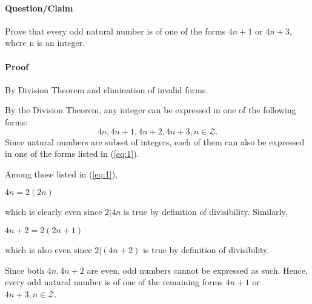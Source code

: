\documentclass[14pt]{extarticle}
\begin{document}
	\paragraph{Question/Claim}
	Prove that every odd natural number is of one of the forms $4n+1$ or $4n+3$, where n is an integer.
	\paragraph{Proof} By Division Theorem and elimination of invalid forms.
	\par\bigskip
	By the Division Theorem, any integer can be expressed in one of the following forms:
	\begin{equation}\label{eq:1}
	4n, 4n+1, 4n+2, 4n+3, n \in \mathcal{Z}.
	\end{equation}
	Since natural numbers are subset of integers, each of them can also be expressed in one of the forms listed in (\ref{eq:1}).
	\par\bigskip
	Among those listed in (\ref{eq:1}),
	\begin{center}
		$4n = 2(2n)$
	\end{center}
	which is clearly even since $2|4n$ is true by definition of divisibility.  Similarly,
	\begin{center}
		$4n+2 = 2(2n+1)$
	\end{center}
	which is also even since $2|(4n+2)$ is true by definition of divisibility.
	\par\bigskip
	Since both $4n, 4n+2$ are even, odd numbers cannot be expressed as such.  Hence, every odd natural number is of one of the remaining forms $4n+1$ or $4n+3, n \in \mathcal{Z}$.
\end{document}
